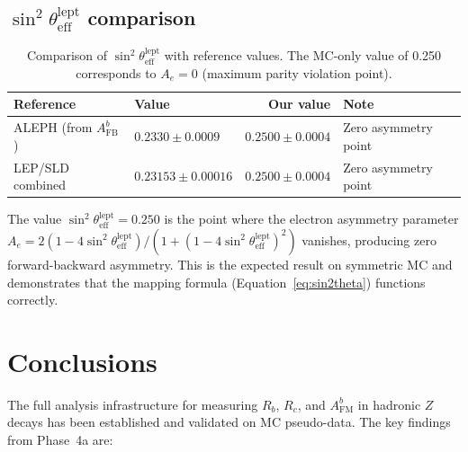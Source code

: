 \documentclass[11pt,a4paper]{article}
\begin{document}
\subsection{$\sin^2\theta_\mathrm{eff}^\mathrm{lept}$ comparison}
\label{sec:sin2theta_comparison}

\begin{table}[htbp]
\centering
\caption{Comparison of $\sin^2\theta_\mathrm{eff}^\mathrm{lept}$ with reference values.
The MC-only value of 0.250 corresponds to $A_e = 0$ (maximum parity violation point).}
\label{tab:sin2theta_comparison}
\begin{tabular}{llrl}
\toprule
Reference & Value & Our value & Note \\
\midrule
ALEPH (from $A_\mathrm{FB}^b$)~\cite{ALEPH:AFBb} & $0.2330 \pm 0.0009$ & $0.2500 \pm 0.0004$ & Zero asymmetry point \\
LEP/SLD combined~\cite{LEP:EWWG:2005} & $0.23153 \pm 0.00016$ & $0.2500 \pm 0.0004$ & Zero asymmetry point \\
\bottomrule
\end{tabular}
\end{table}

The value $\sin^2\theta_\mathrm{eff}^\mathrm{lept} = 0.250$ is the point where
the electron asymmetry parameter $A_e = 2(1 - 4\sin^2\theta_\mathrm{eff}^\mathrm{lept})/
(1 + (1 - 4\sin^2\theta_\mathrm{eff}^\mathrm{lept})^2)$ vanishes, producing zero
forward-backward asymmetry. This is the expected result on symmetric MC and demonstrates
that the mapping formula (Equation~\ref{eq:sin2theta}) functions correctly.

\FloatBarrier
{}
\section{Conclusions}
\label{sec:conclusions}

The full analysis infrastructure for measuring $R_b$, $R_c$, and $A_\mathrm{FM}^b$ in
hadronic $Z$ decays has been established and validated on MC pseudo-data. The key
findings from Phase~4a are:
\end{document}
